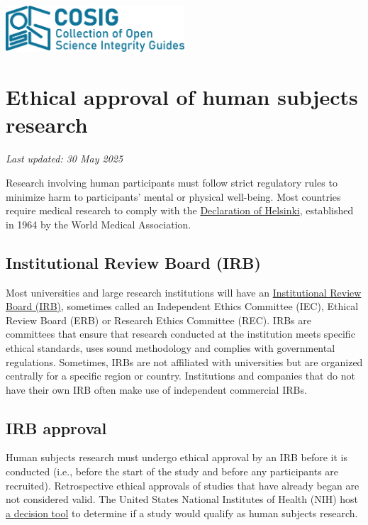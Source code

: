 \documentclass[letterpaper, 12pt]{article}
\begin{document}
\flushleft
\includegraphics[width=0.5\textwidth]{img/home/241017_final_logo_mockup.png}

\section*{Ethical approval of human subjects research}
\textit{Last updated: 30 May 2025}

Research involving human participants must follow strict regulatory rules to minimize harm to participants' mental or physical well-being. Most countries require medical research to comply with the \href{https://www.wma.net/policies-post/wma-declaration-of-helsinki/}{Declaration of Helsinki}, established in 1964 by the World Medical Association.

\subsection*{Institutional Review Board (IRB)}

Most universities and large research institutions will have an \href{https://en.wikipedia.org/wiki/Institutional_review_board#Exceptions}{Institutional Review Board (IRB)}, sometimes called an Independent Ethics Committee (IEC), Ethical Review Board (ERB) or Research Ethics Committee (REC). IRBs are committees that ensure that research conducted at the institution meets specific ethical standards, uses sound methodology and complies with governmental regulations. Sometimes, IRBs are not affiliated with universities but are organized centrally for a specific region or country. Institutions and companies that do not have their own IRB often make use of independent commercial IRBs.

\subsection*{IRB approval}

Human subjects research must undergo ethical approval by an IRB before it is conducted (i.e., before the start of the study and before any participants are recruited). Retrospective ethical approvals of studies that have already began are not considered valid. The United States National Institutes of Health (NIH) host \href{https://grants.nih.gov/policy-and-compliance/policy-topics/human-subjects/hs-decision}{a decision tool} to determine if a study would qualify as human subjects research.
\end{document}
